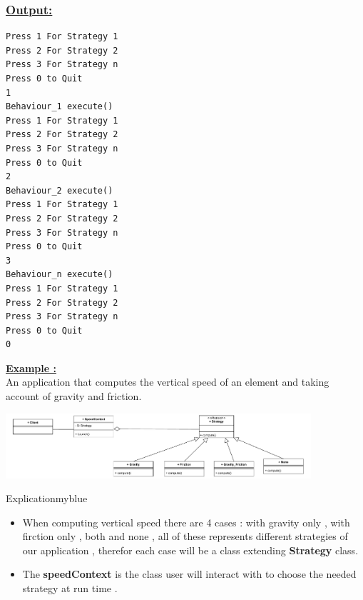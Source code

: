 

\subsubsection*{\underline{Output:}}
\begin{lstlisting}[style=cmd]
Press 1 For Strategy 1
Press 2 For Strategy 2
Press 3 For Strategy n
Press 0 to Quit
1
Behaviour_1 execute()
Press 1 For Strategy 1
Press 2 For Strategy 2
Press 3 For Strategy n
Press 0 to Quit
2
Behaviour_2 execute()
Press 1 For Strategy 1
Press 2 For Strategy 2
Press 3 For Strategy n
Press 0 to Quit
3
Behaviour_n execute()
Press 1 For Strategy 1
Press 2 For Strategy 2
Press 3 For Strategy n
Press 0 to Quit
0

\end{lstlisting}

\newpage

\textbf{\underline{Example :}}\\[0.15cm]
An application that computes the vertical speed of an element and taking account of gravity and friction.

\vspace{0.5cm}

\begin{center}
\includegraphics[width=0.85\textwidth]{Chapters/DesignPattern/Strategy/str2.drawio.pdf}
\end{center}

\vspace{0.5cm}

\begin{prettyBox}{Explication}{myblue}
    \begin{itemize}
        \item When computing vertical speed there are 4 cases : with gravity only , with firction only , both and none , all of these
            represents different strategies of our application , therefor each case will be a class extending \textbf{Strategy} class.
        \item The \textbf{speedContext} is the class user will interact with to choose the needed strategy at run time .
    \end{itemize}
\end{prettyBox}

